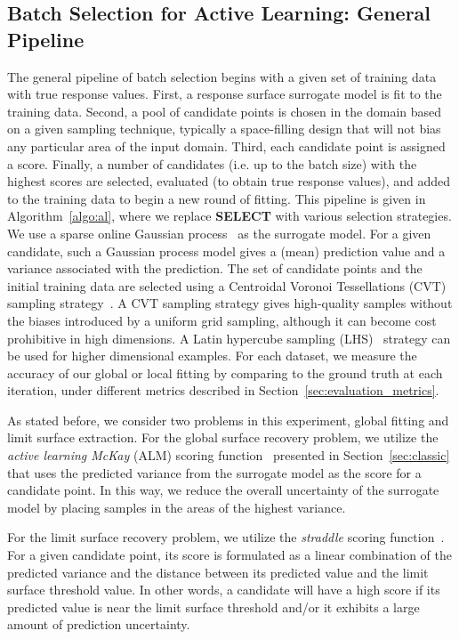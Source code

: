 \subsection{Batch Selection for Active Learning: General Pipeline}
The general pipeline of batch selection begins with a given set of training data with true response values.
%
First, a response surface surrogate model is fit to the training data.
%
Second, a pool of candidate points is chosen in the domain based on a given sampling technique, typically a space-filling design that will not bias any particular area of the input domain.
%
Third, each candidate point is assigned a score.
%
Finally, a number of candidates (i.e. up to the batch size) with the highest scores are selected, evaluated (to obtain true response values), and added to the training data to begin a new round of fitting.
%
This pipeline is given in Algorithm~\ref{algo:al}, where we replace \textbf{SELECT} with various selection strategies.
%
We use a sparse online Gaussian process~\cite{CsatoOpper2002} as the surrogate model.
%
For a given candidate, such a Gaussian process model gives a (mean) prediction value and a variance associated with the prediction.
%
The set of candidate points and the initial training data are selected using a Centroidal Voronoi Tessellations (CVT) sampling strategy~\cite{DuFaberGunzburger1999}.
%
A CVT sampling strategy gives high-quality samples without the biases introduced by a uniform grid sampling, although it can become cost prohibitive in high dimensions.
%
A Latin hypercube sampling (LHS)~\cite{ImanDavenportZeigler1980} strategy can be used for higher dimensional examples.
%
For each dataset, we measure the accuracy of our global or local fitting by comparing to the ground truth at each iteration, under different metrics described in Section~\ref{sec:evaluation_metrics}.

As stated before, we consider two problems in this experiment, global fitting and limit surface extraction.
%
For the global surface recovery problem, we utilize the \emph{active learning McKay} (ALM) scoring function~\cite{MacKay1992} presented in Section~\ref{sec:classic} that uses the predicted variance from the surrogate model as the score for a candidate point.
%
In this way, we reduce the overall uncertainty of the surrogate model by placing samples in the areas of the highest variance.

For the limit surface recovery problem, we utilize the \emph{straddle} scoring function~\cite{BryanSchneiderNichol2005}.
%
For a given candidate point, its score is formulated as a linear combination of the predicted variance and the distance between its predicted value and the limit surface threshold value.
%
In other words, a candidate will have a high score if its predicted value is near the limit surface threshold and/or it exhibits a large amount of prediction uncertainty.

